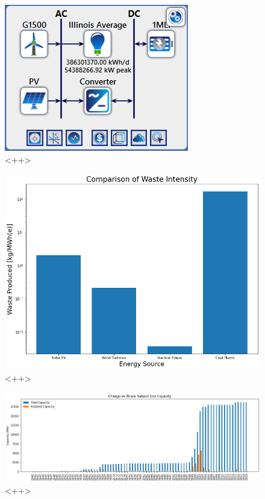 \begin{figure}[ht]
	\centering
	\includegraphics[width=\columnwidth]{./img/homer_system_setup.png}
	\caption{<++>}
	\label{fig:<++>}
\end{figure}


\begin{figure}[ht]
	\centering
	\includegraphics[width=\columnwidth]{./img/mass-waste-intensity.png}
	\caption{<++>}
	\label{fig:<++>}
\end{figure}


\begin{figure}[ht]
	\centering
	\includegraphics[width=\columnwidth]{./img/annual_installed_cap_natgas.png}
	\caption{<++>}
	\label{fig:<++>}
\end{figure}

